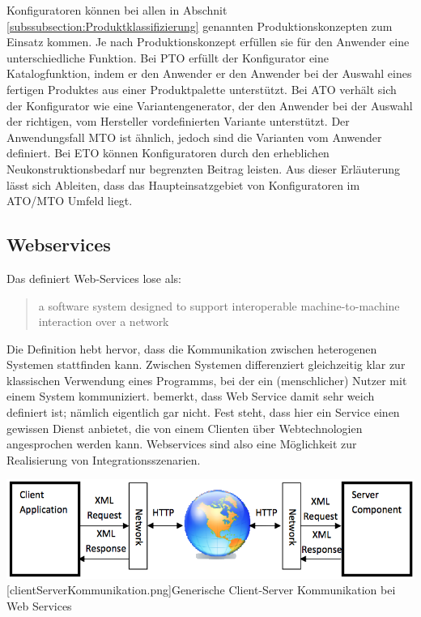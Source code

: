 \documentclass[12pt,a4paper,bibliography=totocnumbered,listof=totoc]{scrartcl}
\begin{document}
Konfiguratoren können bei allen in Abschnit \ref{subssubsection:Produktklassifizierung} genannten Produktionskonzepten zum Einsatz kommen. Je nach Produktionskonzept erfüllen sie für den Anwender eine unterschiedliche Funktion. Bei \ac{PTO} erfüllt der Konfigurator eine Katalogfunktion, indem er den Anwender er den Anwender bei der Auswahl eines fertigen Produktes aus einer Produktpalette unterstützt. Bei \ac{ATO} verhält sich der Konfigurator wie eine Variantengenerator, der den Anwender bei der Auswahl der richtigen, vom Hersteller vordefinierten Variante unterstützt. Der Anwendungsfall \ac{MTO} ist ähnlich, jedoch sind die Varianten vom Anwender definiert. Bei \ac{ETO} können Konfiguratoren durch den erheblichen Neukonstruktionsbedarf nur begrenzten Beitrag leisten. Aus dieser Erläuterung lässt sich Ableiten, dass das Haupteinsatzgebiet von Konfiguratoren im \ac{ATO}/\ac{MTO} Umfeld liegt.

\subsection{Webservices}

Das \citet	{w3c04} definiert Web-Services lose als:

\begin{quote}
\glqq [...] a software system designed to support interoperable machine-to-machine interaction over a network\grqq
\end{quote}

Die Definition hebt hervor, dass die Kommunikation zwischen heterogenen Systemen stattfinden kann. \glqq Zwischen Systemen\grqq{} differenziert gleichzeitig klar zur klassischen Verwendung eines Programms, bei der ein (menschlicher) Nutzer mit einem System kommuniziert. \citet{tilkov11} bemerkt, dass Web Service damit sehr weich definiert ist; \glqq nämlich eigentlich gar nicht\grqq{}. Fest steht, dass hier ein Service einen gewissen Dienst anbietet, die von einem Clienten über Webtechnologien angesprochen werden kann. Webservices sind also eine Möglichkeit zur Realisierung von Integrationsszenarien.

\vspace{1em}
\begin{minipage}{\linewidth}
	\centering
	\includegraphics[width=0.7\linewidth]{Abbildungen/clientServerKommunikation.png}
	[clientServerKommunikation.png]{Generische Client-Server Kommunikation bei Web Services}
	\label{fig:clientServerKommunikation.png}
\end{minipage}
\vspace{1em}
\end{document}
